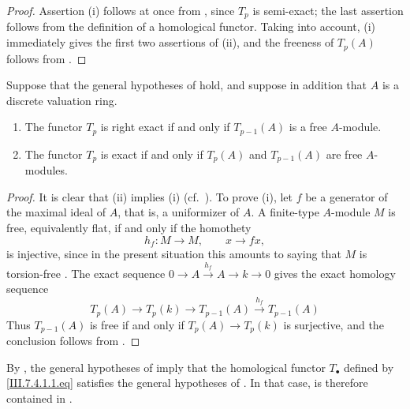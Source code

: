 \begin{proof}
Assertion (i) follows at once from , since
$T_p$ is semi-exact; the last assertion follows from the
definition of a homological functor.  Taking
 into account, (i) immediately gives the first
two assertions of (ii), and the freeness of $T_p(A)$ follows
from .
\end{proof}

\begin{corollary}[7.5.6]
\label{III.7.5.6}
Suppose that the general hypotheses of  hold,
and suppose in addition that $A$ is a discrete valuation
ring.
\begin{enumerate}
  \item[\textup{(i)}] The functor $T_p$ is right exact if and only if
    $T_{p-1}(A)$ is a free $A$-module.
  \item[\textup{(ii)}] The functor $T_p$ is exact if and only if
    $T_p(A)$ and $T_{p-1}(A)$ are free $A$-modules.
\end{enumerate}
\end{corollary}

\begin{proof}
It is clear that (ii) implies (i) (cf.\
).  To prove (i), let $f$ be a generator of
the maximal ideal of $A$, that is, a uniformizer of $A$.  A
finite-type $A$-module $M$ is free, equivalently flat, if and
only if the homothety
\[
  h_f:M\longrightarrow M,\qquad x\to fx,
\]
is injective, since in the present situation this amounts to
saying that $M$ is torsion-free .  The exact
sequence $0\longrightarrow A\xrightarrow{h_f}A\longrightarrow k\longrightarrow0$
gives the exact homology sequence
\[
  T_p(A)
  \longrightarrow T_p(k)
  \longrightarrow T_{p-1}(A)
  \xrightarrow{h_f}
  T_{p-1}(A)
\]
Thus $T_{p-1}(A)$ is free if and only if
$T_p(A)\to T_p(k)$ is surjective, and the conclusion follows
from .
\end{proof}

\begin{remark}[7.5.7]
\label{III.7.5.7}
By , the general hypotheses of
 imply that the homological functor
$T_\bullet$ defined by \eqref{III.7.4.1.1.eq} satisfies the
general hypotheses of .  In that case,
 is therefore contained in
.
\end{remark}
